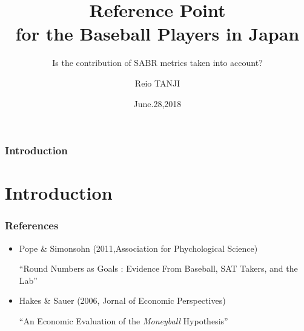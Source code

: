 \documentclass[dvipdfmx,11pt]{beamer}
\title{Reference Point \\ for the Baseball Players in Japan}
\subtitle{Is the contribution of SABR metrics taken into account?}
\author{Reio TANJI}
\date{June.28,2018}
\institute{Osaka University}
\begin{document}
\begin{frame}\frametitle{Introduction}
\titlepage
\end{frame}

\section{Introduction}
\begin{frame}\frametitle{References}

\begin{itemize}

\item Pope \& Simonsohn (2011,Association for Phychological Science)

``Round Numbers as Goals : Evidence From Baseball, SAT Takers, and the Lab''

\item Hakes \& Sauer (2006, Jornal of Economic Perspectives)

``An Economic Evaluation of the \textit{Moneyball} Hypothesis''

\end{itemize}

\end{frame}
\end{document}
